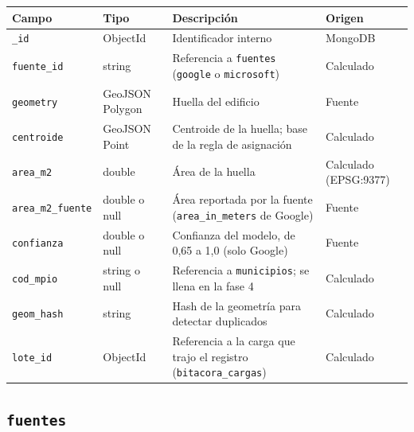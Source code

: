 \documentclass[11pt,a4paper]{article}
\newcommand{\campo}[1]{\texttt{#1}}
\begin{document}
\begin{table}[H]
\centering\small
\begin{tabularx}{\textwidth}{@{}p{3cm}p{3.2cm}Lp{2.6cm}@{}}
\toprule
\textbf{Campo} & \textbf{Tipo} & \textbf{Descripción} & \textbf{Origen} \\
\midrule
\campo{\_id} & ObjectId & Identificador interno & MongoDB \\
\campo{fuente\_id} & string & Referencia a \campo{fuentes} (\campo{google} o \campo{microsoft}) & Calculado \\
\campo{geometry} & GeoJSON Polygon & Huella del edificio & Fuente \\
\campo{centroide} & GeoJSON Point & Centroide de la huella; base de la regla de asignación & Calculado \\
\campo{area\_m2} & double & Área de la huella & Calculado (EPSG:9377) \\
\campo{area\_m2\_fuente} & double o null & Área reportada por la fuente (\campo{area\_in\_meters} de Google) & Fuente \\
\campo{confianza} & double o null & Confianza del modelo, de 0,65 a 1,0 (solo Google) & Fuente \\
\campo{cod\_mpio} & string o null & Referencia a \campo{municipios}; se llena en la fase 4 & Calculado \\
\campo{geom\_hash} & string & Hash de la geometría para detectar duplicados & Calculado \\
\campo{lote\_id} & ObjectId & Referencia a la carga que trajo el registro (\campo{bitacora\_cargas}) & Calculado \\
\bottomrule
\end{tabularx}
\end{table}
 
\subsection{\texorpdfstring{\campo{fuentes}}{fuentes}}
 
\end{document}
